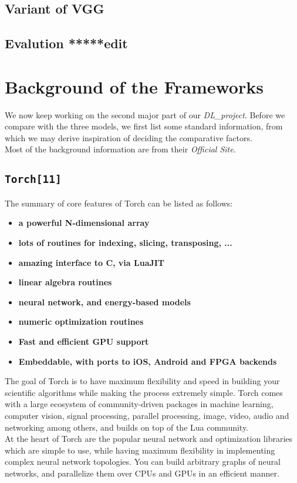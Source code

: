 \documentclass[12pt]{article}
\begin{document}
\subsection{Variant of VGG}

\subsection{Evalution *****edit}




\section{Background of the Frameworks}

We now keep working on the second major part of our {\it DL\_project}. Before we compare with the three models, we first list some standard information, from which we may derive inspiration of deciding the comparative factors.\\
Most of the background information are from their {\it Official Site}.

\subsection{\texttt{Torch[11]}}
The summary of core features of Torch can be listed as follows:
\begin{itemize}
	\item {\bf a powerful N-dimensional array}
	\item {\bf lots of routines for indexing, slicing, transposing, ...}
	\item {\bf amazing interface to C, via LuaJIT}
	\item {\bf linear algebra routines}
	\item {\bf neural network, and energy-based models}
	\item {\bf numeric optimization routines}
	\item {\bf Fast and efficient GPU support}
	\item {\bf Embeddable, with ports to iOS, Android and FPGA backends}
\end{itemize}
The goal of Torch is to have maximum flexibility and speed in building your scientific algorithms while making the process extremely simple. Torch comes with a large ecosystem of community-driven packages in machine learning, computer vision, signal processing, parallel processing, image, video, audio and networking among others, and builds on top of the Lua community.\\
At the heart of Torch are the popular neural network and optimization libraries which are simple to use, while having maximum flexibility in implementing complex neural network topologies. You can build arbitrary graphs of neural networks, and parallelize them over CPUs and GPUs in an efficient manner.
\end{document}
